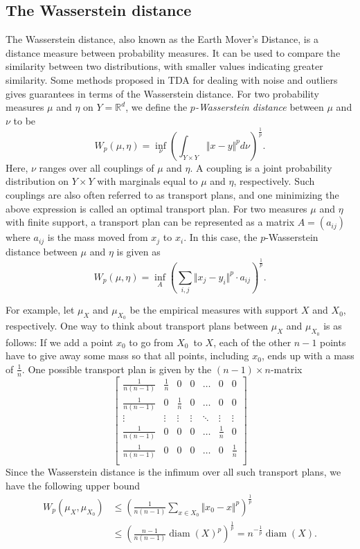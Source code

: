 \documentclass[10pt,a4paper]{article}
\theoremstyle{definition}
\newcommand{\R}{\mathbb{R}}
\begin{document}

\subsection{The Wasserstein distance}
The Wasserstein distance, also known as the Earth Mover's Distance, is a distance measure between probability measures. It can be used to compare the similarity between two distributions, with smaller values indicating greater similarity. Some methods proposed in TDA for dealing with noise and outliers gives guarantees in terms of the Wasserstein distance. For two probability measures $\mu$ and $\eta$ on $Y=\R^d$, we define the \textit{$p$-Wasserstein distance} between $\mu$ and $\nu$ to be
$$
W_p(\mu, \eta) = \inf_{\nu}\left(\int_{Y\times Y}\Vert x-y\Vert^p d\nu\right)^{\frac{1}{p}}.
$$
Here, $\nu$ ranges over all couplings of $\mu$ and $\eta$. A coupling is a joint probability distribution on $Y\times Y$ with marginals equal to $\mu$ and $\eta$, respectively. Such couplings are also often referred to as transport plans, and one minimizing the above expression is called an optimal transport plan. For two measures $\mu$ and $\eta$ with finite support, a transport plan can be represented as a matrix $A=(a_{ij})$ where $a_{ij}$ is the mass moved from $x_j$ to $x_i$. In this case, the $p$-Wasserstein distance between $\mu$ and $\eta$ is given as
$$
W_p(\mu, \eta) = \inf_A \left(\sum_{i,j}\Vert x_j - y_i\Vert^p\cdot a_{ij}\right)^{\frac{1}{p}}.
$$

For example, let $\mu_X$ and $\mu_{X_0}$ be the empirical measures with support $X$ and $X_0$, respectively. One way to think about transport plans between $\mu_X$ and $\mu_{X_0}$ is as follows: If we add a point $x_0$ to go from $X_0$ to $X$, each of the other $n-1$ points have to give away some mass so that all points, including $x_0$, ends up with a mass of $\frac{1}{n}$. One possible transport plan is given by the $(n-1)\times n$-matrix
$$
	\begin{bmatrix} 
	\frac{1}{n(n-1)} & \frac{1}{n} & 0 & 0 & \dots  & 0 & 0\\
	\frac{1}{n(n-1)} & 0 & \frac{1}{n} & 0 & \dots  & 0 & 0\\
	\vdots & \vdots & \vdots & \vdots & \ddots & \vdots & \vdots \\
	\frac{1}{n(n-1)} & 0 & 0 & 0 & \hdots & \frac{1}{n}  & 0 \\
	\frac{1}{n(n-1)} & 0 & 0 & 0 & \hdots & 0 & \frac{1}{n}  \\
	\end{bmatrix}
$$
Since the Wasserstein distance is the infimum over all such transport plans, we have the following upper bound
\begin{align*}
W_p(\mu_X, \mu_{X_0})&\leq \left(\frac{1}{n(n-1)}\sum_{x\in X_0}\Vert x_0-x\Vert^p\right)^{\frac{1}{p}} \\&\leq\left(\frac{n-1}{n(n-1)}\operatorname{diam}(X)^p\right)^{\frac{1}{p}} = n^{-\frac{1}{p}} \operatorname{diam}(X).
\end{align*}
\end{document}
